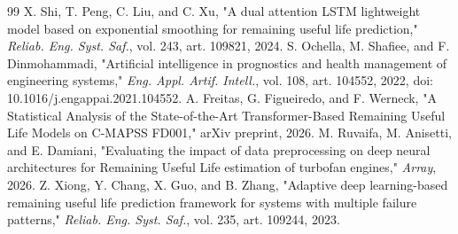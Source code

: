 \documentclass[preprint,10pt]{elsarticle}
\begin{document}
\begin{thebibliography}{99}
  X. Shi, T. Peng, C. Liu, and C. Xu, "A dual attention LSTM lightweight model based on exponential smoothing for remaining useful life prediction," \textit{Reliab. Eng. Syst. Saf.}, vol. 243, art. 109821, 2024.
  S. Ochella, M. Shafiee, and F. Dinmohammadi, "Artificial intelligence in prognostics and health management of engineering systems," \textit{Eng. Appl. Artif. Intell.}, vol. 108, art. 104552, 2022, doi: 10.1016/j.engappai.2021.104552.
  A. Freitas, G. Figueiredo, and F. Werneck, "A Statistical Analysis of the State-of-the-Art Transformer-Based Remaining Useful Life Models on C-MAPSS FD001," arXiv preprint, 2026.
  M. Ruvaifa, M. Anisetti, and E. Damiani, "Evaluating the impact of data preprocessing on deep neural architectures for Remaining Useful Life estimation of turbofan engines," \textit{Array}, 2026.
  Z. Xiong, Y. Chang, X. Guo, and B. Zhang, "Adaptive deep learning-based remaining useful life prediction framework for systems with multiple failure patterns," \textit{Reliab. Eng. Syst. Saf.}, vol. 235, art. 109244, 2023.
\end{thebibliography}
\end{document}
